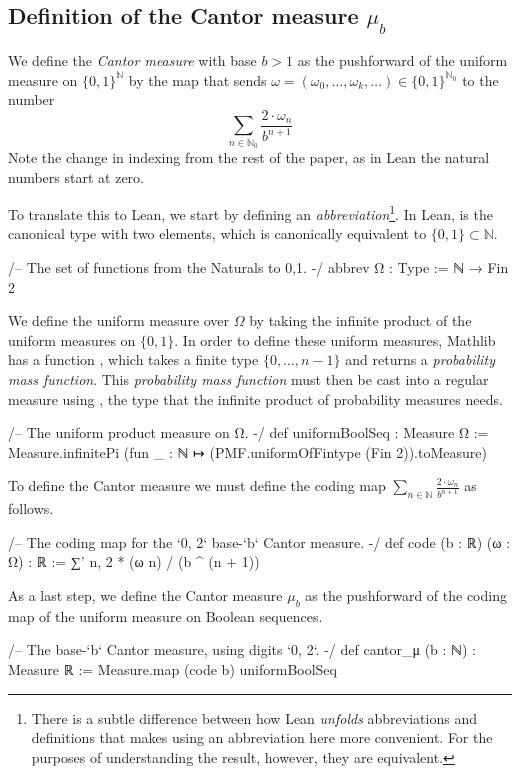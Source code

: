 \documentclass[reqno,a4paper,12pt]{amsart}
\begin{document}
\subsection{Definition of the Cantor measure \texorpdfstring{$\mu_b$}{mu b}}

We define the \emph{Cantor measure} with base $b>1$ as the pushforward of the uniform measure on  $\{0,1\}^{\mathbb N}$ by the map that sends  $\omega = (\omega_0, \dots , \omega_k, \dots) \in \{0,1\}^{\mathbb N_0}$ to the number 
$$
\sum_{n\in \mathbb N_0} \frac{2\cdot \omega_n}{b^{n+1}}
$$
Note the change in indexing from the rest of the paper, as in Lean the natural numbers start at zero.

To translate this to Lean, we start by defining an \emph{abbreviation}\footnote{There is a subtle difference between how Lean \emph{unfolds} abbreviations and definitions that makes using an abbreviation here more convenient. For the purposes of understanding the result, however, they are equivalent.}. In Lean,  is the canonical type with two elements, which is canonically equivalent to  $\{0,1\}\subset \mathbb N$.
\begin{leancode}
/-- The set of functions from the Naturals to {0,1}. -/
abbrev Ω : Type := ℕ → Fin 2
\end{leancode}
We define the uniform measure over $\Omega$ by taking the infinite product of the uniform measures on $\{ 0,1 \}$. In order to define these uniform measures, Mathlib has a function , which takes a finite type $\{ 0, \dots, n-1 \}$ and returns a \emph{probability mass function}. This \emph{probability mass function} must then be cast into a regular measure using , the type that the infinite product of probability measures needs. 
\begin{leancode}
/-- The uniform product measure on Ω. -/
def uniformBoolSeq : Measure Ω :=
  Measure.infinitePi 
    (fun _ : ℕ ↦ (PMF.uniformOfFintype (Fin 2)).toMeasure)
\end{leancode}
To define the Cantor measure we must define the coding map $\sum_{n\in \mathbb N} \frac{2\cdot \omega_n}{b^{n+1}}$ as follows.
\begin{leancode}
/-- The coding map for the `{0, 2}` base-`b` Cantor measure. -/
def code (b : ℝ) (ω : Ω) : ℝ :=
  ∑' n, 2 * (ω n) / (b ^ (n + 1))
\end{leancode}
As a last step, we define the Cantor measure $\mu_b$ as the pushforward of the coding map of the uniform measure on Boolean sequences.
\begin{leancode}
/-- The base-`b` Cantor measure, using digits `{0, 2}`. -/
def cantor_μ (b : ℕ) : Measure ℝ :=
  Measure.map (code b) uniformBoolSeq
\end{leancode}
\end{document}
